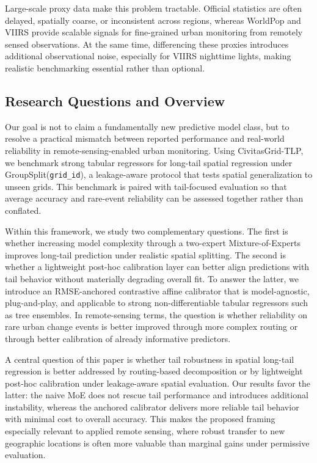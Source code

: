 \documentclass[preprint,12pt]{elsarticle}
\begin{document}
Large-scale proxy data make this problem tractable. Official statistics are often delayed, spatially coarse, or inconsistent across regions, whereas WorldPop and VIIRS provide scalable signals for fine-grained urban monitoring from remotely sensed observations. At the same time, differencing these proxies introduces additional observational noise, especially for VIIRS nighttime lights, making realistic benchmarking essential rather than optional.

\subsection{Research Questions and Overview}

Our goal is not to claim a fundamentally new predictive model class, but to resolve a practical mismatch between reported performance and real-world reliability in remote-sensing-enabled urban monitoring. Using CivitasGrid-TLP, we benchmark strong tabular regressors for long-tail spatial regression under GroupSplit(\texttt{grid\_id}), a leakage-aware protocol that tests spatial generalization to unseen grids. This benchmark is paired with tail-focused evaluation so that average accuracy and rare-event reliability can be assessed together rather than conflated.

Within this framework, we study two complementary questions. The first is whether increasing model complexity through a two-expert Mixture-of-Experts improves long-tail prediction under realistic spatial splitting. The second is whether a lightweight post-hoc calibration layer can better align predictions with tail behavior without materially degrading overall fit. To answer the latter, we introduce an RMSE-anchored contrastive affine calibrator that is model-agnostic, plug-and-play, and applicable to strong non-differentiable tabular regressors such as tree ensembles. In remote-sensing terms, the question is whether reliability on rare urban change events is better improved through more complex routing or through better calibration of already informative predictors.

A central question of this paper is whether tail robustness in spatial long-tail regression is better addressed by routing-based decomposition or by lightweight post-hoc calibration under leakage-aware spatial evaluation. Our results favor the latter: the naive MoE does not rescue tail performance and introduces additional instability, whereas the anchored calibrator delivers more reliable tail behavior with minimal cost to overall accuracy. This makes the proposed framing especially relevant to applied remote sensing, where robust transfer to new geographic locations is often more valuable than marginal gains under permissive evaluation.
\end{document}
